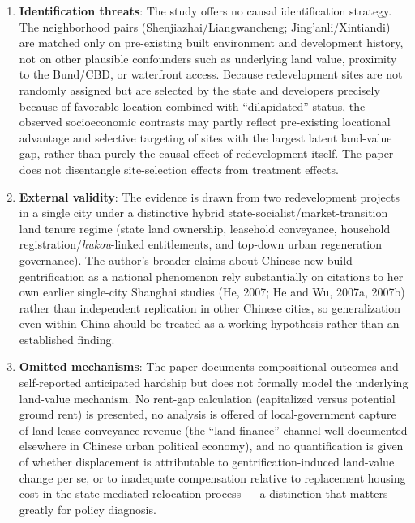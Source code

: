 \begin{enumerate}
  \item \textbf{Identification threats}: The study offers no causal identification strategy. The neighborhood pairs (Shenjiazhai/Liangwancheng; Jing'anli/Xintiandi) are matched only on pre-existing built environment and development history, not on other plausible confounders such as underlying land value, proximity to the Bund/CBD, or waterfront access. Because redevelopment sites are not randomly assigned but are selected by the state and developers precisely because of favorable location combined with ``dilapidated'' status, the observed socioeconomic contrasts may partly reflect pre-existing locational advantage and selective targeting of sites with the largest latent land-value gap, rather than purely the causal effect of redevelopment itself. The paper does not disentangle site-selection effects from treatment effects.
  \item \textbf{External validity}: The evidence is drawn from two redevelopment projects in a single city under a distinctive hybrid state-socialist/market-transition land tenure regime (state land ownership, leasehold conveyance, household registration/\emph{hukou}-linked entitlements, and top-down urban regeneration governance). The author's broader claims about Chinese new-build gentrification as a national phenomenon rely substantially on citations to her own earlier single-city Shanghai studies (He, 2007; He and Wu, 2007a, 2007b) rather than independent replication in other Chinese cities, so generalization even within China should be treated as a working hypothesis rather than an established finding.
  \item \textbf{Omitted mechanisms}: The paper documents compositional outcomes and self-reported anticipated hardship but does not formally model the underlying land-value mechanism. No rent-gap calculation (capitalized versus potential ground rent) is presented, no analysis is offered of local-government capture of land-lease conveyance revenue (the ``land finance'' channel well documented elsewhere in Chinese urban political economy), and no quantification is given of whether displacement is attributable to gentrification-induced land-value change per se, or to inadequate compensation relative to replacement housing cost in the state-mediated relocation process --- a distinction that matters greatly for policy diagnosis.

\end{enumerate}
